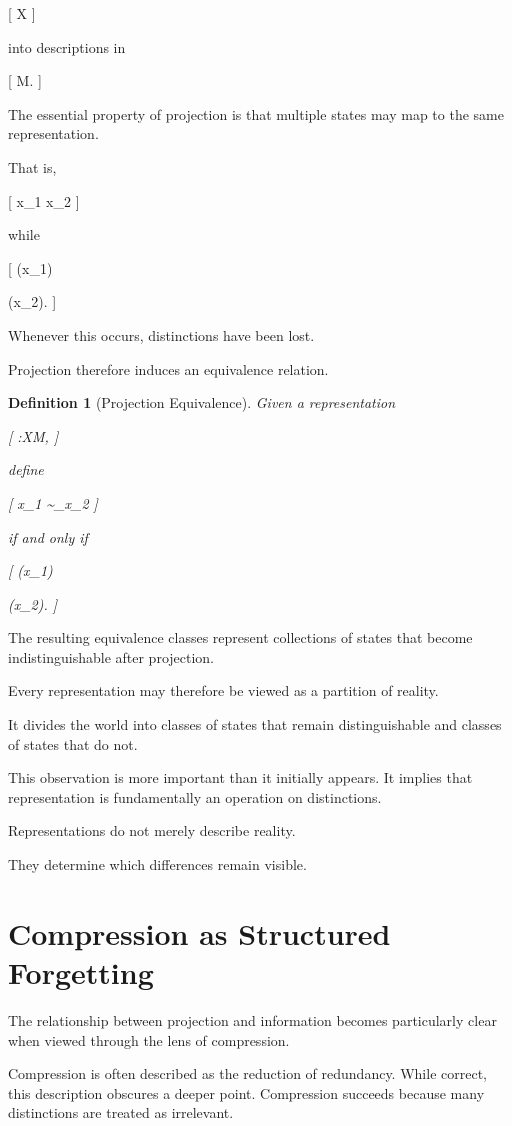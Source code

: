 \documentclass[11pt,oneside,openany]{book}
\newtheorem{definition}{Definition}[chapter] \newtheorem{theorem}{Theorem}[chapter] \newtheorem{proposition}{Proposition}[chapter] \newtheorem{lemma}{Lemma}[chapter] \newtheorem{corollary}{Corollary}[chapter] \newtheorem{remark}{Remark}[chapter]
\begin{document}
[
\mathcal X
]

into descriptions in

[
\mathcal M.
]

The essential property of projection is that multiple states may map to the same representation.

That is,

[
x_1 \neq x_2
]

while

[
\pi(x_1)

\pi(x_2).
]

Whenever this occurs, distinctions have been lost.

Projection therefore induces an equivalence relation.

\begin{definition}[Projection Equivalence]

Given a representation

[
\pi:\mathcal X\rightarrow\mathcal M,
]

define

[
x_1 \sim_\pi x_2
]

if and only if

[
\pi(x_1)

\pi(x_2).
]

\end{definition}

The resulting equivalence classes represent collections of states that become indistinguishable after projection.

Every representation may therefore be viewed as a partition of reality.

It divides the world into classes of states that remain distinguishable and classes of states that do not.

This observation is more important than it initially appears. It implies that representation is fundamentally an operation on distinctions.

Representations do not merely describe reality.

They determine which differences remain visible.

\section{Compression as Structured Forgetting}

The relationship between projection and information becomes particularly clear when viewed through the lens of compression.

Compression is often described as the reduction of redundancy. While correct, this description obscures a deeper point. Compression succeeds because many distinctions are treated as irrelevant.
\end{document}
